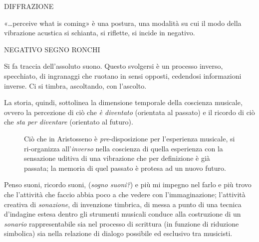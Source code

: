 \documentclass{../../lib/gs}
\begin{document}
\vspace{1cm}

DIFFRAZIONE

«\ldots perceive what is coming» è una postura, una modalità su cui il modo della
vibrazione acustica si schianta, si riflette, si incide in negativo.

\vspace{1cm}

NEGATIVO SEGNO RONCHI

Si fa traccia dell'assoluto suono. Questo svolgersi è un processo inverso,
specchiato, di ingranaggi che ruotano in sensi opposti, cedendosi informazioni
inverse. Ci si timbra, ascoltando, con l'ascolto.

La storia, quindi, sottolinea la dimensione temporale della coscienza musicale,
ovvero la percezione di ciò che \emph{è diventato} (orientata al passato) e il
ricordo di ciò che \emph{sta per diventare} (orientato al futuro).

\begin{figure}[htbp]
\begin{center}
\caption{Ciò che in Aristosseno è \emph{pre}-disposizione per l'esperienza
musicale, si ri-organizza all'\emph{inverso} \cite{bergson:segno} nella coscienza
di quella esperienza con la sensazione uditiva di una vibrazione che per
definizione è già passata; la memoria di quel passato è protesa ad un nuovo futuro.}
\label{coscienza}
\end{center}
\end{figure}

Penso suoni, ricordo suoni, (\emph{sogno suoni?}) e più mi impegno nel farlo e
più trovo che l'attività che faccio abbia poco a che vedere con l'immaginazione;
l'attività creativa di \emph{sonazione}, di invenzione timbrica, di messa a
punto di una tecnica d'indagine estesa dentro gli strumenti musicali
\cite{netti23} conduce alla costruzione di un \emph{sonario} rappresentabile sia
nel processo di scrittura (in funzione di riduzione simbolica) sia nella
relazione di dialogo possibile ed esclusivo tra musicisti.
\end{document}
